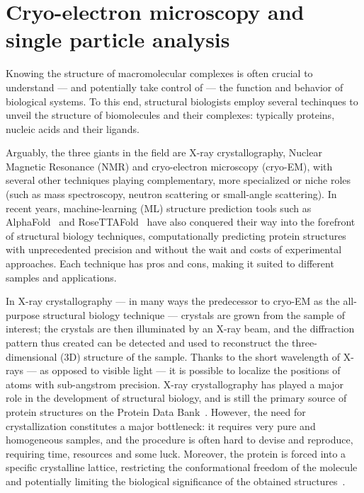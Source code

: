 \chapter[Cryo-EM and SPA]{Cryo-electron microscopy and single particle analysis}\label{em}

Knowing the structure of macromolecular complexes is often crucial to understand --- and potentially take control of --- the function and behavior of biological systems.
To this end, structural biologists employ several techinques to unveil the structure of biomolecules and their complexes: typically proteins, nucleic acids and their ligands.

Arguably, the three giants in the field are X-ray crystallography, Nuclear Magnetic Resonance (NMR) and cryo-electron microscopy (cryo-EM), with several other techniques playing complementary, more specialized or niche roles (such as mass spectroscopy, neutron scattering or small-angle scattering).
In recent years, machine-learning (ML) structure prediction tools such as AlphaFold~\cite{jumperHighlyAccurateProtein2021,abramsonAccurateStructurePrediction2024} and RoseTTAFold~\cite{baekAccuratePredictionProtein2021} have also conquered their way into the forefront of structural biology techniques, computationally predicting protein structures with unprecedented precision and without the wait and costs of experimental approaches.
Each technique has pros and cons, making it suited to different samples and applications.

In X-ray crystallography --- in many ways the predecessor to cryo-EM as the all-purpose structural biology technique --- crystals are grown from the sample of interest; the crystals are then illuminated by an X-ray beam, and the diffraction pattern thus created can be detected and used to reconstruct the three-dimensional (3D) structure of the sample.
Thanks to the short wavelength of X-rays --- as opposed to visible light --- it is possible to localize the positions of atoms with sub-angstrom precision.
X-ray crystallography has played a major role in the development of structural biology, and is still the primary source of protein structures on the Protein Data Bank~\cite{bermanProteinDataBank2000,bermanAnnouncingWorldwideProtein2003}.
However, the need for crystallization constitutes a major bottleneck: it requires very pure and homogeneous samples, and the procedure is often hard to devise and reproduce, requiring time, resources and some luck.
Moreover, the protein is forced into a specific crystalline lattice, restricting the conformational freedom of the molecule and potentially limiting the biological significance of the obtained structures~\cite{ravikumarComparisonSidechainDispersion2022}.

